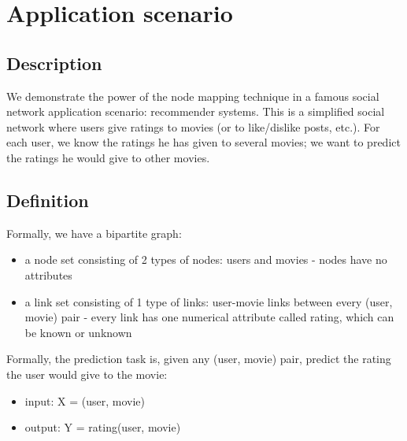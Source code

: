 \documentclass[twocolumn]{article}
\begin{document}
\section{Application scenario}

\subsection{Description}
We demonstrate the power of the node mapping technique in a famous social 
network application scenario: recommender systems.
This is a simplified social network where users give ratings to movies (or to 
like/dislike posts, etc.).
For each user, we know the ratings he has given to several movies; we want to 
predict the ratings he would give to other movies.

\subsection{Definition}
Formally, we have a bipartite graph:
\begin{itemize}
	\item a node set consisting of 2 types of nodes: users and movies - nodes 
	have no attributes
	\item a link set consisting of 1 type of links: user-movie links between 
	every (user, movie) pair - every link has one numerical attribute called 
	rating, which can be known or unknown
\end{itemize}
Formally, the prediction task is, given any (user, movie) pair, predict the 
rating the user would give to the movie:
\begin{itemize}
	\item input: X = (user, movie)
	\item output: Y = rating(user, movie)
\end{itemize}
\end{document}

